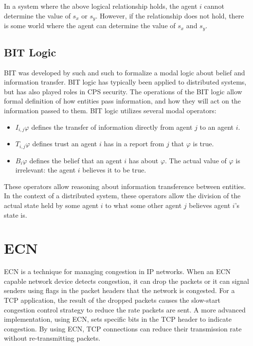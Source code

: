 In a system where the above logical relationship holds, the agent $i$ cannot determine the value of $s_x$ or $s_y$. However, if the relationship does not hold, there is some world where the agent can determine the value of $s_x$ and $s_y$.

\subsection{BIT Logic}

\ac{BIT} was developed by such and such to formalize a modal logic about belief and information transfer. \ac{BIT} logic has typically been applied to distributed systems, but has also played roles in \ac{CPS} security. The operations of the \ac{BIT} logic allow formal definition of how entities pass information, and how they will act on the information passed to them. \ac{BIT} logic utilizes several modal operators:

\begin{itemize}
\item $I_{i,j} \varphi$ defines the transfer of information directly from agent $j$ to an agent $i$. 
\item $T_{i,j} \varphi$ defines trust an agent $i$ has in a report from $j$ that $\varphi$ is true.
\item $B_i \varphi$ defines the belief that an agent $i$ has about $\varphi$. The actual value of $\varphi$ is irrelevant: the agent $i$ believes it to be true.
\end{itemize}

These operators allow reasoning about information transference between entities. In the context of a distributed system, these operators allow the division of the actual state held by some agent $i$ to what some other agent $j$ believes agent $i$'s state is.

\section{ECN}

\ac{ECN} is a technique for managing congestion in IP networks. 
When an \ac{ECN} capable network device detects congestion, it can drop the packets or it can signal senders using flags in the packet headers that the network is congested.
For a TCP application, the result of the dropped packets causes the slow-start congestion control strategy to reduce the rate packets are sent.
A more advanced implementation, using \ac{ECN}, sets specific bits in the TCP header to indicate congestion.
By using \ac{ECN}, TCP connections can reduce their transmission rate without re-transmitting packets.

